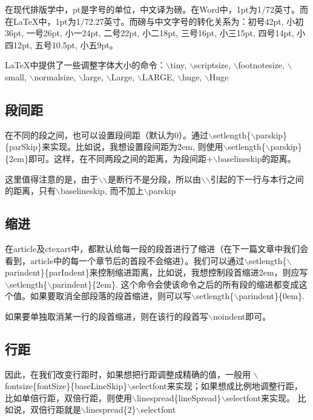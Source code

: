 \documentclass[cn,10pt,math=newtx,citestyle=gb7714-2015,bibstyle=gb7714-2015]{elegantbook}
\begin{document}
在现代排版学中，pt是字号的单位，中文译为磅。在Word中，1pt为1/72英寸。而在LaTeX中，1pt为1/72.27英寸。而磅与中文字号的转化关系为：初号42pt, 小初36pt, 一号26pt, 小一24pt, 二号22pt, 小二18pt, 三号16pt, 小三15pt, 四号14pt, 小四12pt, 五号10.5pt, 小五9pt。

LaTeX中提供了一些调整字体大小的命令：$\backslash$tiny, $\backslash$scriptsize, $\backslash$footnotesize, $\backslash$small, $\backslash$normalsize, $\backslash$large, $\backslash$Large, $\backslash$LARGE, $\backslash$huge, $\backslash$Huge



\subsection{段间距}

在不同的段之间，也可以设置段间距（默认为0）。通过$\backslash$setlength\{$\backslash$parskip\}\{parSkip\}来实现。比如说，我想设置段间距为2em, 则使用$\backslash$setlength\{$\backslash$parskip\}\{2em\}即可。这样，在不同两段之间的距离，为段间距+$\backslash$baselineskip的距离。

这里值得注意的是，由于$\backslash$$\backslash$是断行不是分段，所以由$\backslash$$\backslash$引起的下一行与本行之间的距离，只有$\backslash$baselineskip, 而不加上$\backslash$parskip

\subsection{缩进}

在article及ctexart中，都默认给每一段的段首进行了缩进（在下一篇文章中我们会看到，article中的每一个章节后的首段不会缩进）。我们可以通过$\backslash$setlength\{$\backslash$parindent\}\{parIndent\}来控制缩进距离，比如说，我想控制段首缩进2em，则应写$\backslash$setlength\{$\backslash$parindent\}\{2em\}. 这个命令会使该命令之后的所有段的缩进都变成这个值。如果要取消全部段落的段首缩进，则可以写$\backslash$setlength\{$\backslash$parindent\}\{0em\}.

如果要单独取消某一行的段首缩进，则在该行的段首写$\backslash$noindent即可。

\subsection{行距}

因此，在我们改变行距时，如果想把行距调整成精确的值，一般用 $\backslash$fontsize\{fontSize\}\{baseLineSkip\}$\backslash$selectfont来实现；如果想成比例地调整行距，比如单倍行距，双倍行距，则使用$\backslash$linespread\{lineSpread\}$\backslash$selectfont来实现。 比如说，双倍行距就是$\backslash$linespread\{2\}$\backslash$selectfont
\end{document}
